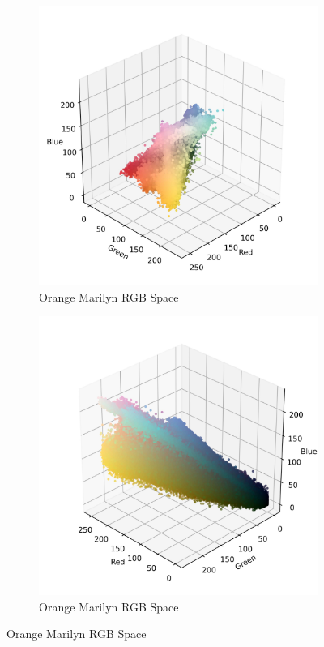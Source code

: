 \documentclass{article}
\begin{document}
\begin{figure}[ht]
  \centering
  \begin{subfigure}{0.45\textwidth}
    \includegraphics[width=\textwidth]{main_files/figure-latex/4_1_orange_marilyn_original_scatter.jpg}
    \caption{Orange Marilyn RGB Space}
    \label{fig:4_1_orange_marilyn_original_scatter}
  \end{subfigure}
  \hfill
  \begin{subfigure}{0.45\textwidth}
    \includegraphics[width=\textwidth]{main_files/figure-latex/4_2_orange_marilyn_original_scatter.jpg}
    \caption{Orange Marilyn RGB Space}
    \label{fig:4_2_orange_marilyn_original_scatter}
  \end{subfigure}
  \label{fig:orange_marilyn_original_scatter_1}
\end{figure}
\end{document}
